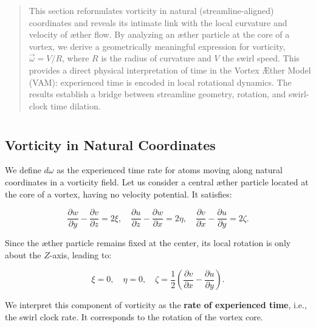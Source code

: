 \documentclass[12pt]{article}
\begin{document}
    \titlepageOpen

    \begin{abstract}
        This section reformulates vorticity in natural (streamline-aligned) coordinates and reveals its intimate link with the local curvature and velocity of æther flow. By analyzing an æther particle at the core of a vortex, we derive a geometrically meaningful expression for vorticity, \(\vec{\omega} = V / R\), where \(R\) is the radius of curvature and \(V\) the swirl speed. This provides a direct physical interpretation of time in the Vortex Æther Model (VAM): experienced time is encoded in local rotational dynamics. The results establish a bridge between streamline geometry, rotation, and swirl-clock time dilation.
    \end{abstract}


    \titlepageClose
    \fi

    \section{\papertitle}
    \subsection{Vorticity in Natural Coordinates}

    We define \( d\omega \) as the experienced time rate for atoms moving along natural coordinates in a vorticity field. Let us consider a central æther particle located at the core of a vortex, having no velocity potential. It satisfies:

    \begin{equation}
        \frac{\partial w}{\partial y} - \frac{\partial v}{\partial z} = 2\xi, \quad
        \frac{\partial u}{\partial z} - \frac{\partial w}{\partial x} = 2\eta, \quad
        \frac{\partial v}{\partial x} - \frac{\partial u}{\partial y} = 2\zeta.
    \end{equation}

    Since the æther particle remains fixed at the center, its local rotation is only about the \(Z\)-axis, leading to:

    \begin{equation}
        \xi = 0, \quad \eta = 0, \quad \zeta = \frac{1}{2} \left( \frac{\partial v}{\partial x} - \frac{\partial u}{\partial y} \right).
    \end{equation}

    We interpret this component of vorticity as the \textbf{rate of experienced time}, i.e., the swirl clock rate. It corresponds to the rotation of the vortex core.
\end{document}
